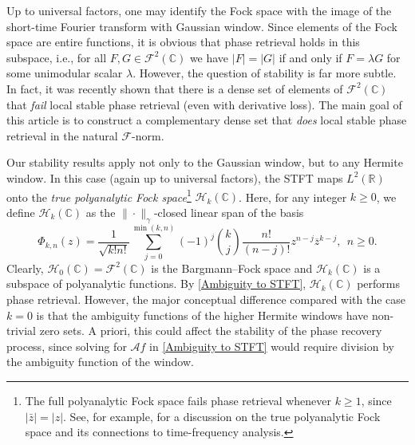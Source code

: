 \documentclass[11pt]{amsart}
\theoremstyle{remark}
\begin{document}
Up to universal factors, one may identify the Fock space with the image of the short-time Fourier transform with Gaussian window.
Since elements of the Fock space are entire functions, it is obvious that phase retrieval holds in this subspace, i.e., for all $F,G\in \mathcal{F}^2(\mathbb{C})$ we have $|F|=|G|$ if and only if $F=\lambda G$ for some unimodular scalar $\lambda$. However, the question of stability is far more subtle. In fact, it was recently shown \cite{alaifari2025cheeger,Alharbi2024Locality} that there is a dense set of elements of $\mathcal{F}^2(\mathbb{C})$ that \emph{fail} local stable phase retrieval (even with derivative loss). The main goal of this article is to construct a complementary dense set that \emph{does} local stable phase retrieval in the natural $\mathcal{F}$-norm.
 \vspace{0.5em}

Our stability results  apply not only to the Gaussian window, but to any Hermite window. In this case (again up to universal factors), the STFT maps $L^2(\mathbb{R})$ onto the \emph{true polyanalytic Fock space}\footnote{The full polyanalytic Fock space fails phase retrieval whenever $k\geq 1$, since $|\bar{z}|=|z|$. See, for example, \cite{MR3203099} for a discussion on the true polyanalytic Fock space and its connections to time-frequency analysis.} $\mathcal{H}_k(\mathbb{C})$. Here, for any integer $k\geq 0$, we define $\mathcal{H}_k(\mathbb{C})$ as the $\|\cdot\|_\gamma$-closed linear span of the  basis
\begin{equation*}
    \Phi_{k,n}(z)=\frac{1}{\sqrt{k!n!}}\sum_{j=0}^{\min(k,n)}(-1)^j\binom{k}{j}\frac{n!}{(n-j)!}z^{n-j}\overline{z}^{k-j}, \ \ n\geq 0.
\end{equation*}
Clearly, $\mathcal{H}_0(\mathbb{C})=\mathcal{F}^2(\mathbb{C})$ is the Bargmann--Fock space and $\mathcal{H}_k(\mathbb{C})$ is a subspace of polyanalytic functions. By \eqref{Ambiguity to STFT}, $\mathcal{H}_k(\mathbb{C})$  performs phase retrieval. However, the major conceptual difference compared with the case $k=0$ is that the ambiguity functions of the higher Hermite windows have non-trivial zero sets. A priori, this could affect the stability of the phase recovery process, since solving for $\mathcal{A}f$ in \eqref{Ambiguity to STFT} would require division by the ambiguity function of the window.
\end{document}
